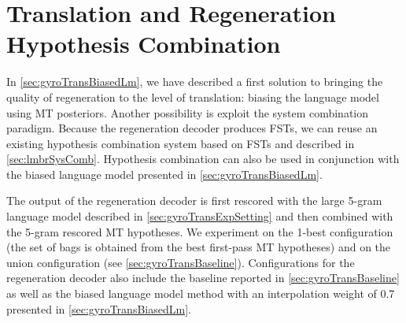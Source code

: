 
\section[Translation and Regeneration Hypothesis Combination]{Translation and Regeneration \\ Hypothesis Combination}
\label{sec:gyroTransSysComb}

In \autoref{sec:gyroTransBiasedLm}, we have described
a first solution to bringing the quality of regeneration
to the level of translation: biasing the language model using
MT posteriors.
Another possibility is exploit
the system combination paradigm.
Because the regeneration decoder produces FSTs, we can
reuse an existing hypothesis combination system based on FSTs and
described in \autoref{sec:lmbrSysComb}.
Hypothesis combination can also be used in conjunction
with the biased language model presented in \autoref{sec:gyroTransBiasedLm}.

The output of the regeneration decoder is first rescored with
the large 5-gram language model described
in \autoref{sec:gyroTransExpSetting} and then combined with the
5-gram rescored MT hypotheses.
We experiment on the
1-best configuration (the set of bags is obtained
from the best first-pass MT hypotheses) and on the union
configuration (see \autoref{sec:gyroTransBaseline}).
Configurations for the regeneration decoder also
include the baseline reported in \autoref{sec:gyroTransBaseline}
as well as the biased language model method with an interpolation
weight of 0.7 presented in \autoref{sec:gyroTransBiasedLm}.

